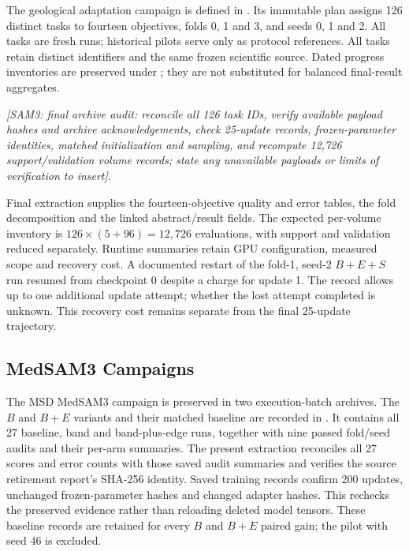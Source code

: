 \documentclass[12pt,a4paper]{article}
\newcommand{\samResult}[1]{\textit{[SAM3: #1 to insert]}}
\begin{document}
The geological adaptation campaign is defined in
.
Its immutable plan assigns 126 distinct tasks to fourteen objectives,
folds 0, 1 and 3, and seeds 0, 1 and 2. All tasks are fresh runs;
historical pilots serve only as protocol references. All tasks retain
distinct identifiers and the same frozen scientific source. Dated progress inventories are preserved under
; they are not substituted
for balanced final-result aggregates.

\noindent\samResult{final archive audit: reconcile all 126 task IDs,
verify available payload hashes and archive acknowledgements, check
25-update records, frozen-parameter identities, matched initialization
and sampling, and recompute 12,726 support/validation volume records;
state any unavailable payloads or limits of verification}.

Final extraction supplies the fourteen-objective quality and error tables,
the fold decomposition and the linked abstract/result fields. The expected
per-volume inventory is $126\times(5+96)=12{,}726$ evaluations, with support
and validation reduced separately. Runtime summaries retain GPU
configuration, measured scope and recovery cost. A documented restart of
the fold-1, seed-2 $B+E+S$ run resumed from checkpoint 0 despite a charge
for update 1. The record allows up to one additional update attempt;
whether the lost attempt completed is unknown. This recovery cost remains
separate from the final 25-update trajectory.

\subsection{MedSAM3 Campaigns}

The MSD MedSAM3 campaign is preserved in two execution-batch archives.
The $B$ and $B+E$ variants and their matched baseline are recorded in
.
It contains all 27 baseline, band and band-plus-edge runs, together
with nine passed fold/seed audits and their per-arm summaries.
The present extraction reconciles all 27 scores and error counts with
those saved audit summaries and verifies the source retirement report's
SHA-256 identity. Saved training records confirm 200 updates, unchanged
frozen-parameter hashes and changed adapter hashes. This rechecks the
preserved evidence rather than reloading deleted model tensors.
These baseline records are retained for every $B$ and $B+E$ paired
gain; the pilot with seed 46 is excluded.
\end{document}
